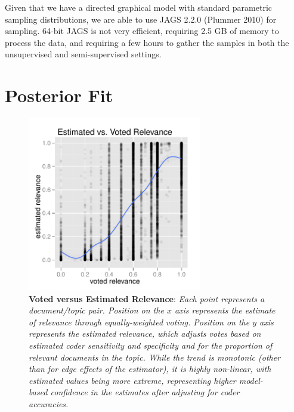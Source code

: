 \documentclass{article}
\begin{document}
Given that we have a directed graphical model with standard parametric
sampling distributions, we are able to use JAGS 2.2.0 (Plummer 2010)
for sampling.  64-bit JAGS is not very efficient, requiring 2.5
GB of memory to process the data, and requiring a few hours to gather
the samples in both the unsupervised and semi-supervised settings.


\section{Posterior Fit}

\begin{figure}
\begin{center}
\includegraphics[height=3.0in]{img/vote_vs_estimate.pdf}
\parbox{5in}{\caption{\small {\bf Voted versus Estimated Relevance}: {\it Each point 
represents a document/topic pair.  Position on the $x$ axis represents 
the estimate of relevance through equally-weighted voting.  Position 
on the $y$ axis represents the estimated relevance, which adjusts
votes based on estimated coder sensitivity and specificity and for the
proportion of relevant documents in the topic.  While the trend is
monotonic (other than for edge effects of the estimator), it is highly
non-linear, with estimated values being more extreme, representing
higher model-based confidence in the estimates after adjusting for
coder accuracies.}}\label{vote_vs_estimate.fig}}
\end{center}
\end{figure}
%
\end{document}
